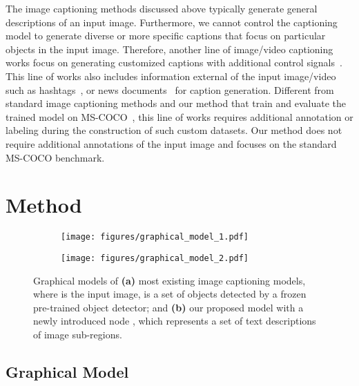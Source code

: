 \documentclass[10pt,twocolumn,letterpaper]{article}
\begin{document}
The image captioning methods discussed above typically generate general descriptions of an input image.
Furthermore, we cannot control the captioning model to generate diverse or more specific captions that focus on particular objects in the input image.
Therefore, another line of image/video captioning works focus on generating customized captions with additional control signals~\cite{whitehead2018incorporating,chunseong2017attend,park2018towards,rimle2021enriching,attend2u:2017:CVPR}.
This line of works also includes information external of the input image/video such as hashtags~\cite{chunseong2017attend}, or news documents~\cite{whitehead2018incorporating} for caption generation.
Different from standard image captioning methods and our method that train and evaluate the trained model on MS-COCO~\cite{lin2014microsoft}, this line of works
requires additional annotation or labeling during the construction of such custom datasets. 
Our method does not require additional annotations of the input image and focuses on  the standard MS-COCO  benchmark. \section{Method}

\begin{figure}
\centering
\begin{subfigure}[b]{.35\columnwidth}
  \centering
  \texttt{[image: figures/graphical\_model\_1.pdf]}
  \caption{}
  \label{figure:graphical-model-1}
\end{subfigure}\begin{subfigure}[b]{.35\columnwidth}
  \centering
  \texttt{[image: figures/graphical\_model\_2.pdf]}
  \caption{}
  \label{figure:graphical-model-2}
\end{subfigure}
\caption{Graphical models of \textbf{(a)} most existing image captioning models, where  is the input image,  is a set of objects detected by a frozen pre-trained object detector; and \textbf{(b)} our proposed model with a newly introduced node , which represents a set of text descriptions of image sub-regions.}
\label{figure:graphical-model}
\vspace{-3.6mm}
\end{figure}

\subsection{Graphical Model}\label{section:graphical-model}
\end{document}
